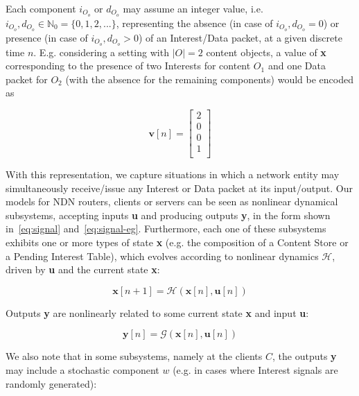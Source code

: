 Each component $i_{O_o}$ or $d_{O_o}$ may assume an integer value, i.e. $i_{O_o}, d_{O_o} \in \mathbb{N}_0 = \{0, 1, 2, ... \}$, 
representing the absence (in case of $i_{O_o}, d_{O_o} = 0$) or presence (in case of $i_{O_o}, d_{O_o} > 0$) of an 
Interest\slash Data packet, at a given discrete time $n$. E.g. considering a setting 
with $|O| = 2$ content objects, a value of \textbf{x} corresponding to the presence 
of two Interests for content $O_1$ and one Data packet for $O_2$ (with the absence 
for the remaining components) would be encoded as

\begin{equation}
    \textbf{v}[n] = \begin{bmatrix}     2   \\ 
                                        0   \\ 
                                        0   \\ 
                                        1   \\ \end{bmatrix}
    \label{eq:signal-eg}
\end{equation}\shortvertbreak

With this 
representation, we capture situations in which a network 
entity may simultaneously receive\slash issue any Interest or Data packet at 
its input\slash output. Our models for NDN routers, clients or servers can be 
seen as nonlinear dynamical subsystems, accepting inputs \textbf{u} and producing 
outputs \textbf{y}, in the form shown in~\ref{eq:signal} 
and~\ref{eq:signal-eg}. Furthermore, each one of these subsystems exhibits one or 
more types of state \textbf{x} (e.g. the composition of a Content Store or a Pending 
Interest Table), which evolves according to nonlinear dynamics $\mathcal{H}$, 
driven by \textbf{u} and the current state \textbf{x}:

\begin{equation}
    \textbf{x}[n + 1] = \mathcal{H}(\textbf{x}[n],\textbf{u}[n])
    \label{eq:state}
\end{equation}%

Outputs \textbf{y} are nonlinearly related to some current state \textbf{x} and input \textbf{u}:

\begin{equation}
    \textbf{y}[n] = \mathcal{G}(\textbf{x}[n],\textbf{u}[n])
    \label{eq:outputs}
\end{equation}%

We also note that in some subsystems, namely at the clients $C$, the outputs 
\textbf{y} may include a stochastic component $w$ (e.g. in cases where Interest 
signals are randomly generated):

